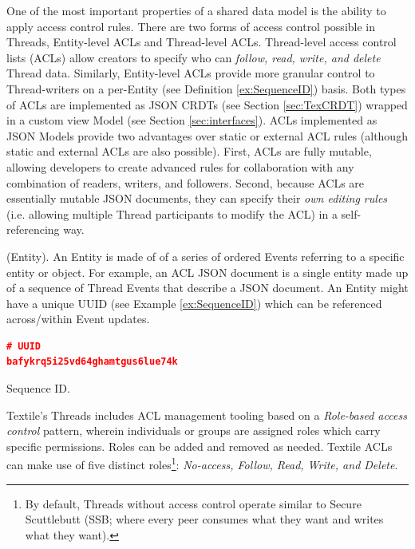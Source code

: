 \documentclass{textile}
\begin{document}
One of the most important properties of a shared data model is the ability to apply access control rules. There are two forms of access control possible in Threads, Entity-level ACLs and Thread-level ACLs. Thread-level access control lists (ACLs) allow creators to specify who can \emph{follow, read, write, and delete} Thread data. Similarly, Entity-level ACLs provide more granular control to Thread-writers on a per-Entity (see Definition \ref{ex:SequenceID}) basis. Both types of ACLs are implemented as JSON CRDTs (see Section \ref{sec:TexCRDT}) wrapped in a custom view Model (see Section \ref{sec:interfaces}). ACLs implemented as JSON Models provide two advantages over static or external ACL rules (although static and external ACLs are also possible). First, ACLs are fully mutable, allowing developers to create advanced rules for collaboration with any combination of readers, writers, and followers. Second, because ACLs are essentially mutable JSON documents, they can specify their \emph{own editing rules} (i.e. allowing multiple Thread participants to modify the ACL) in a self-referencing way.

\begin{definition}
(Entity). An Entity is made of of a series of ordered Events referring to a specific entity or object. For example, an ACL JSON document is a single entity made up of a sequence of Thread Events that describe a JSON document. An Entity might have a unique UUID (see Example \ref{ex:SequenceID}) which can be referenced across/within Event updates.
\end{definition}

\begin{example}[!b]
\centering
\begin{lstlisting}[language=json,firstnumber=1]
# UUID
bafykrq5i25vd64ghamtgus6lue74k
\end{lstlisting}
  \caption{Sequence ID.}
  \label{ex:SequenceID}
\end{example}

Textile's Threads includes ACL management tooling based on a \emph{Role-based access control} \cite{sandhuRolebasedAccessControl1996} pattern, wherein individuals or groups are assigned roles which carry specific permissions. Roles can be added and removed as needed. Textile ACLs can make use of five distinct roles\footnote{By default, Threads without access control operate similar to Secure Scuttlebutt (SSB; where every peer consumes what they want and writes what they want).}: \emph{No-access, Follow, Read, Write, and Delete}.
\end{document}
